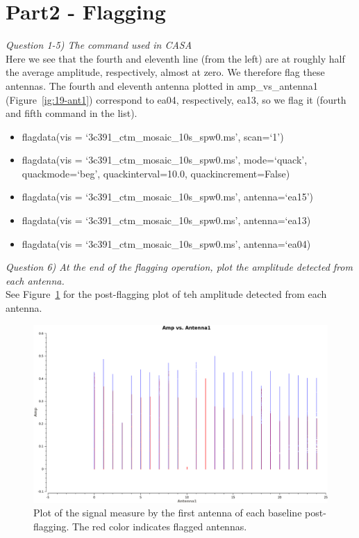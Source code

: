 \documentclass[12pt, a4paper]{article}
\begin{document}
\section{Part2 - Flagging}
\noindent \textit{Question 1-5) The command used in CASA} \\
Here we see that the fourth and eleventh line (from the left) are at roughly half the average amplitude, respectively, almost at zero. We therefore flag these antennas. The fourth and eleventh antenna plotted in amp\_vs\_antenna1 (Figure~\ref{ig:19-ant1}) correspond to ea04, respectively, ea13, so we flag it (fourth and fifth command in the list). \\
\begin{itemize}
    \item flagdata(vis = `3c391\_ctm\_mosaic\_10s\_spw0.ms', scan=`1')
    \item flagdata(vis = `3c391\_ctm\_mosaic\_10s\_spw0.ms', mode=`quack', quackmode=`beg', quackinterval=10.0, quackincrement=False)
    \item flagdata(vis = `3c391\_ctm\_mosaic\_10s\_spw0.ms', antenna=`ea15')
    \item flagdata(vis = `3c391\_ctm\_mosaic\_10s\_spw0.ms', antenna=`ea13)
    \item flagdata(vis = `3c391\_ctm\_mosaic\_10s\_spw0.ms', antenna=`ea04)
\end{itemize}

\noindent \textit{Question 6) At the end of the flagging operation, plot the amplitude detected from each antenna.}  \\
See Figure~\ref{fig:part2-q6} for the post-flagging plot of teh amplitude detected from each antenna.
\begin{figure}
    \centering
    \includegraphics[scale=0.3]{../Imaging/plots/amp_vs_antenna1_part2_vraag6_with_display-FlaggedPointsSymbol-custom.png}
    \caption{Plot of the signal measure by the first antenna of each baseline post-flagging. The red color indicates flagged antennas. \label{fig:part2-q6}}
\end{figure}
\end{document}
